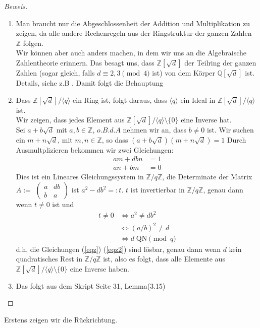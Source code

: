 \documentclass{article}
\newcommand{\Rational}{\ensuremath{\mathbb{Q}}}
\newcommand{\Integer}{\ensuremath{\mathbb{Z}}}
\newcommand{\Qadjd}{\ensuremath{\Rational[\sqrt{d}]}}
\newcommand{\Zadjd}{\ensuremath{\Integer[\sqrt{d}]}}
\newcommand{\ZAdjdModq}{\ensuremath{\Integer[\sqrt{d}]/\langle q \rangle}}
\newcommand{\Zmodq}{\ensuremath{\Integer/q\Integer}}
\newcommand{\ZadjdModqOhnez}{\ensuremath{\ZAdjdModq \setminus\! \{ 0 \}}}
\newcommand{\QNmodq}{\ensuremath{\mbox{QN} \! \pmod{q}}}
\begin{document}
\begin{proof}[Beweis]
	\begin{enumerate}
		\item Man braucht nur die Abgeschlossenheit der Addition und Multiplikation zu zeigen, da alle andere Rechenregeln aus der Ringstruktur der ganzen Zahlen $\Integer$ folgen. \\ Wir k\"{o}nnen aber auch anders machen, in dem wir uns an die Algebraische Zahlentheorie erinnern. Das besagt uns, dass $\Zadjd$ der Teilring der ganzen Zahlen (sogar gleich, falls $d \equiv {2,3} \pmod{4}$ ist) von dem K\"{o}rper $\Qadjd$ ist. Details, siehe z.B \cite{zahlentheorie}. Damit folgt
		die Behauptung
		\item 
		Dass $\ZAdjdModq$ ein Ring ist, folgt daraus, dass $\langle q \rangle$ ein Ideal in $\ZAdjdModq$ ist.\\
		Wir zeigen, dass jedes Element aus $\ZadjdModqOhnez$ eine Inverse hat.\\
		Sei $a + b\sqrt{d}$ mit $a,b\in \Integer$, $o.B.d.A$ nehmen wir an, dass $b \neq 0$ ist. Wir suchen ein $m + n\sqrt{d}$, mit $m,n \in \Integer$, so dass $(a + b\sqrt{d})(m + n\sqrt{d}) = 1$ Durch Ausmultplizieren bekommen wir zwei Gleichungen:
		\begin{align}
		am + dbn &= 1 \label{eqz}\\
		an + bm &= 0  \label{eqz2}
		\end{align} 
		Dies ist ein Lineares Gleichungssystem in $\Zmodq$, die Determinate der Matrix $A := $
		$\begin{pmatrix}
		a & db\\
		b & a
		\end{pmatrix}$
		ist $a^2 - db^2 =: t$. $t$ ist invertierbar in $\Zmodq$, genau dann wenn $t\neq 0$ ist und 
		\begin{align*}
			t \neq 0 &\Leftrightarrow a^2 \neq db^2 \\
				&\Leftrightarrow (a/b)^2 \neq d\\
				&\Leftrightarrow d \; \QNmodq
		\end{align*}
		d.h, die Gleichungen (\ref{eqz}) (\ref{eqz2}) sind l\"{o}sbar, genau dann wenn
		$d$ kein quadratisches Rest in $\Zmodq$ ist, also es folgt, dass
		alle Elemente aus $\ZadjdModqOhnez$ eine Inverse haben.
		\item
		Das folgt aus dem Skript \cite{script} Seite 31, Lemma(3.15)
	\end{enumerate}
\end{proof}
Erstens zeigen wir die R\"{u}ckrichtung.
\end{document}
